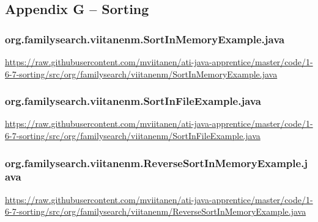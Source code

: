 \subsection*{Appendix G -- Sorting} \label{App:AppendixG}

\subsubsection*{org.familysearch.viitanenm.SortInMemoryExample.java}
\noindent
\begin{minipage}{.6in}
\end{minipage}
\begin{minipage}{6in}
  \url{https://raw.githubusercontent.com/mviitanen/ati-java-apprentice/master/code/1-6-7-sorting/src/org/familysearch/viitanenm/SortInMemoryExample.java}
\end{minipage}

\vspace{1em}
\subsubsection*{org.familysearch.viitanenm.SortInFileExample.java}
\noindent
\begin{minipage}{.6in}
\end{minipage}
\begin{minipage}{6in}
  \url{https://raw.githubusercontent.com/mviitanen/ati-java-apprentice/master/code/1-6-7-sorting/src/org/familysearch/viitanenm/SortInFileExample.java}
\end{minipage}

\vspace{1em}
\subsubsection*{org.familysearch.viitanenm.ReverseSortInMemoryExample.java}
\noindent
\begin{minipage}{.6in}
\end{minipage}
\begin{minipage}{6in}
  \url{https://raw.githubusercontent.com/mviitanen/ati-java-apprentice/master/code/1-6-7-sorting/src/org/familysearch/viitanenm/ReverseSortInMemoryExample.java}
\end{minipage}


